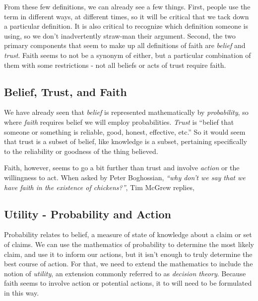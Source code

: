 From these few definitions, we can already see a few things.  First, people use the term in different ways, at different times, so it will be critical that we tack down a particular definition.  It is also critical to recognize which definition someone is using, so we don't inadvertently straw-man their argument.  Second, the two primary components that seem to make up all definitions of faith are {\em belief} and {\em trust}.  Faith seems to not be a synonym of either, but a particular combination of them with some restrictions - not all beliefs or acts of trust require faith.

\subsection{Belief, Trust, and Faith}

We have already seen that {\em belief} is represented mathematically by {\em probability}, so where {\em faith} requires belief we will employ probabilities.  {\em Trust}\cite{MerriamWebster2009} is ``belief that someone or something is reliable, good, honest, effective, etc.'' So it would seem that trust is a subset of belief, like knowledge is a subset, pertaining specifically to the reliability or goodness of the thing believed. 

Faith, however, seems to go a bit further than trust and involve {\em action} or the willingness to act.  When asked by Peter Boghossian, {\em ``why don't we say that we have faith in the existence of chickens?''}, Tim McGrew replies, 

\subsection{Utility - Probability and Action}

Probability relates to belief, a measure of state of knowledge about a claim or set of claims.  We can use the mathematics of probability to determine the most likely claim, and use it to inform our actions, but it isn't enough to truly determine the best course of action.  For that, we need to extend the mathematics to include the notion of {\em utility}, an extension commonly referred to as {\em decision theory}.  Because faith seems to involve action or potential actions, it to will need to be formulated in this way.  

